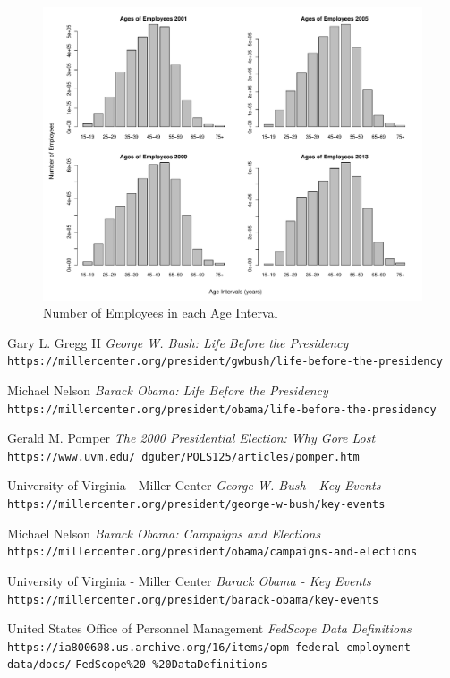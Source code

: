 \documentclass{article}
\begin{document}
\begin{center}
    \begin{figure}
        \includegraphics[scale=0.3]{./images/histogram-ages-2001-2013.pdf}
        \caption{Number of Employees in each Age Interval}
        \label{agehistograms}
    \end{figure}
\end{center}

\newpage

\begin{thebibliography}{10}
    Gary L. Gregg II
    \textit{George W. Bush: Life Before the Presidency}
    \texttt{https://millercenter.org/president/gwbush/life-before-the-presidency}

    Michael Nelson
    \textit{Barack Obama: Life Before the Presidency}
    \texttt{https://millercenter.org/president/obama/life-before-the-presidency}

    Gerald M. Pomper
    \textit{The 2000 Presidential Election: Why Gore Lost}
    \texttt{https://www.uvm.edu/~dguber/POLS125/articles/pomper.htm}

    University of Virginia - Miller Center
    \textit{George W. Bush - Key Events}
    \texttt{https://millercenter.org/president/george-w-bush/key-events}

    Michael Nelson
    \textit{Barack Obama: Campaigns and Elections}
    \texttt{https://millercenter.org/president/obama/campaigns-and-elections}

    University of Virginia - Miller Center
    \textit{Barack Obama - Key Events}
    \texttt{https://millercenter.org/president/barack-obama/key-events}

    United States Office of Personnel Management
    \textit{FedScope Data Definitions}
    \texttt{https://ia800608.us.archive.org/16/items/opm-federal-employment-data/docs/}
    \texttt{FedScope\%20-\%20DataDefinitions}

\end{thebibliography}
\end{document}
